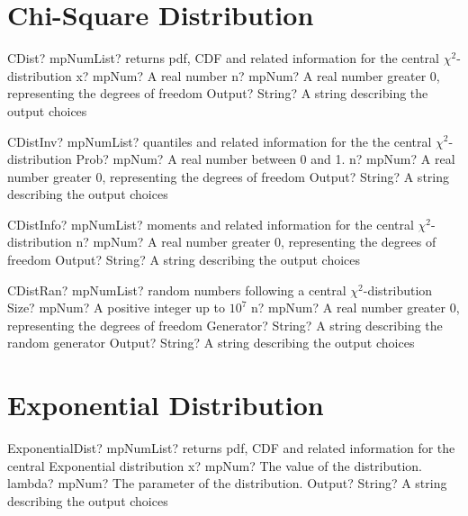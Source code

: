 \documentclass[12pt,a4paper,openany]{book}
\begin{document}
\section{Chi-Square Distribution}

\begin{mpFunctionsExtract}
\mpFunctionThree
{CDist? mpNumList? returns pdf, CDF and related information for the central $\chi^2$-distribution}
{x? mpNum? A real number}
{n? mpNum? A real number greater 0, representing the degrees of freedom}
{Output? String? A string describing the output choices}
\end{mpFunctionsExtract}

\begin{mpFunctionsExtract}
\mpFunctionThree
{CDistInv? mpNumList? quantiles and related information for the the central $\chi^2$-distribution}
{Prob? mpNum? A real number between 0 and 1.}
{n? mpNum? A real number greater 0, representing the degrees of freedom}
{Output? String? A string describing the output choices}
\end{mpFunctionsExtract}

\begin{mpFunctionsExtract}
\mpFunctionTwo
{CDistInfo? mpNumList? moments and related information for the central $\chi^2$-distribution}
{n? mpNum? A real number greater 0, representing the degrees of freedom}
{Output? String? A string describing the output choices}
\end{mpFunctionsExtract}

\begin{mpFunctionsExtract}
\mpFunctionFour
{CDistRan? mpNumList? random numbers following a central $\chi^2$-distribution}
{Size? mpNum? A positive integer up to $10^7$}
{n? mpNum? A real number greater 0, representing the degrees of freedom}
{Generator? String? A string describing the random generator}
{Output? String? A string describing the output choices}
\end{mpFunctionsExtract}

\section{Exponential Distribution}

\begin{mpFunctionsExtract}
\mpFunctionThree
{ExponentialDist? mpNumList? returns pdf, CDF and related information for the central Exponential distribution}
{x? mpNum? The value of the distribution.}
{lambda? mpNum? The parameter of the distribution.}
{Output? String? A string describing the output choices}
\end{mpFunctionsExtract}
\end{document}
